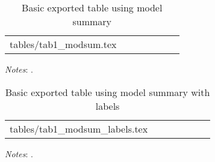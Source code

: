 \documentclass[a4paper]{article}
\makeatletter
\newcommand\primitiveinput[1]
{\@@input #1 }
\makeatother
\begin{document}
\newpage 

\begin{table}[H]
	\centering
	\label{tab:tab1_summ_stats_modsum}
	\begin{adjustbox}{max width=\linewidth}
		\begin{threeparttable}
			\caption{Basic exported table using model summary}
      \begin{tabular}{lcccccc}
        \toprule
        \midrule
        \primitiveinput{tables/tab1_modsum.tex}
        \bottomrule
      \end{tabular}
			  \begin{tablenotes}
				  \setlength{}
				  \footnotesize
				  \item \textit{Notes}: \lipsum[1].
			  \end{tablenotes}
		\end{threeparttable}
	\end{adjustbox}
\end{table}

\begin{table}[H]
	\centering
	\label{tab:tab1_summ_stats_modsum_labels}
	\begin{adjustbox}{max width=\linewidth}
		\begin{threeparttable}
			\caption{Basic exported table using model summary with labels}
      \begin{tabular}{lcccccc}
        \toprule
        \midrule
        \primitiveinput{tables/tab1_modsum_labels.tex}
        \bottomrule
      \end{tabular}
			  \begin{tablenotes}
				  \setlength\labelsep{0pt}
				  \footnotesize
				  \item \textit{Notes}: \lipsum[1].
			  \end{tablenotes}
		\end{threeparttable}
	\end{adjustbox}
\end{table}


\end{document}
